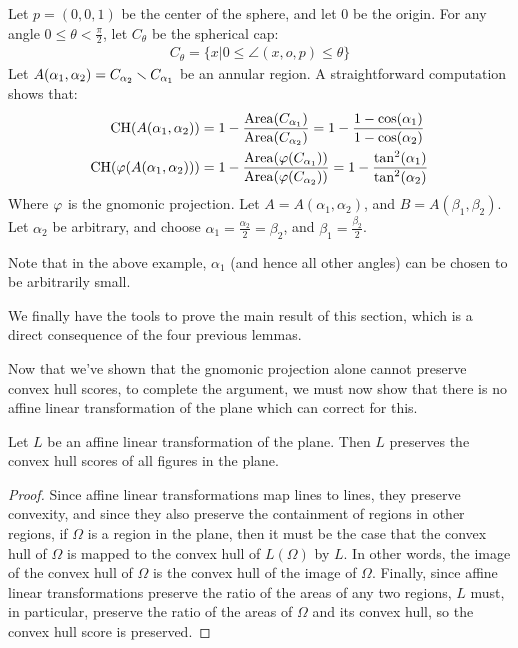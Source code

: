 {\begin{example}
  Let $p = (0,0,1)$ be the center of the sphere, and let $0$ be the
  origin. For any angle $0\le \theta< \frac\pi2$, let $C_\theta$ be
  the spherical cap:
  \begin{align*}
    C_{\theta} = \{x|0\le\angle(x,o,p)\le \theta\}
  \end{align*}
  Let $A(\alpha_1,\alpha_2) = C_{\alpha_2}\smallsetminus C_{\alpha_1}$ be 
  an annular region. A straightforward computation shows that:
  \begin{align*}
    \mathrm{CH}(A(\alpha_1,\alpha_2)) &= 
    1-\frac{\mathrm{Area}(C_{\alpha_1})}{\mathrm{Area}(C_{\alpha_2})}
    =1- \frac{1-\cos(\alpha_1)}{1-\cos(\alpha_2)}\\
    \mathrm{CH}(\vphi(A(\alpha_1,\alpha_2))) &=
    1-\frac{\mathrm{Area}(\vphi(C_{\alpha_1}))}%
    {\mathrm{Area}(\vphi(C_{\alpha_2}))}
      =1- \frac{\tan^2(\alpha_1)}{\tan^2(\alpha_2)}
  \end{align*}
  Where $\varphi$ is the gnomonic projection. 
  Let $A=A(\alpha_1,\alpha_2)$, and $B = A(\beta_1,\beta_2)$. 
  Let $\alpha_2$ be arbitrary, and choose 
  $\alpha_1 = \frac{\alpha_2}{2} = \beta_2$, and 
  $\beta_1 = \frac{\beta_2}{2}$. 
\end{example}
Note that in the above example, $\alpha_1$ (and hence 
all other angles) can be chosen to be arbitrarily small. 
}


We finally have the tools to prove the main result of this section,
which is a direct consequence of the four previous lemmas.



Now that we've shown that the gnomonic projection alone cannot
preserve convex hull scores, to complete the argument, we must now
show that there is no affine linear transformation of the plane which
can correct for this.

\begin{lemma}\label{lem:noafflin}
	Let $L$ be an affine linear transformation of the plane.  Then $L$
	preserves the convex hull scores of all figures in the plane.
\end{lemma}
\begin{proof}
	Since affine linear transformations map lines to lines, they preserve
	convexity, and since they also preserve the containment of regions in
	other regions, if $\Omega$ is a region in the plane, then it must be
	the case that the convex hull of $\Omega$ is mapped to the convex hull
	of $L(\Omega)$ by $L$.  In other words, the image of the convex hull
	of $\Omega$ is the convex hull of the image of $\Omega$.  Finally,
	since affine linear transformations preserve the ratio of the areas of
	any two regions, $L$ must, in particular, preserve the ratio of the
	areas of $\Omega$ and its convex hull, so the convex hull score is
	preserved.
\end{proof}
